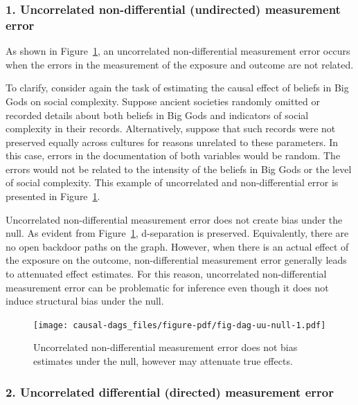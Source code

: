 \documentclass[
  singlecolumn]{report}
\begin{document}
\hypertarget{uncorrelated-non-differential-undirected-measurement-error}{%
\subsubsection{\texorpdfstring{1. \textbf{Uncorrelated non-differential
(undirected) measurement
error}}{1. Uncorrelated non-differential (undirected) measurement error}}\label{uncorrelated-non-differential-undirected-measurement-error}}

As shown in Figure~\ref{fig-dag-uu-null}, an uncorrelated
non-differential measurement error occurs when the errors in the
measurement of the exposure and outcome are not related.

To clarify, consider again the task of estimating the causal effect of
beliefs in Big Gods on social complexity. Suppose ancient societies
randomly omitted or recorded details about both beliefs in Big Gods and
indicators of social complexity in their records. Alternatively, suppose
that such records were not preserved equally across cultures for reasons
unrelated to these parameters. In this case, errors in the documentation
of both variables would be random. The errors would not be related to
the intensity of the beliefs in Big Gods or the level of social
complexity. This example of uncorrelated and non-differential error is
presented in Figure~\ref{fig-dag-uu-null}.

Uncorrelated non-differential measurement error does not create bias
under the null. As evident from Figure~\ref{fig-dag-uu-null},
d-separation is preserved. Equivalently, there are no open backdoor
paths on the graph. However, when there is an actual effect of the
exposure on the outcome, non-differential measurement error generally
leads to attenuated effect estimates. For this reason, uncorrelated
non-differential measurement error can be problematic for inference even
though it does not induce structural bias under the null.

\begin{figure}

{\centering \texttt{[image: causal-dags\_files/figure-pdf/fig-dag-uu-null-1.pdf]}

}

\caption{\label{fig-dag-uu-null}Uncorrelated non-differential
measurement error does not bias estimates under the null, however may
attenuate true effects.}

\end{figure}

\hypertarget{uncorrelated-differential-directed-measurement-error}{%
\subsubsection{\texorpdfstring{2. \textbf{Uncorrelated differential
(directed) measurement
error}}{2. Uncorrelated differential (directed) measurement error}}\label{uncorrelated-differential-directed-measurement-error}}
\end{document}
